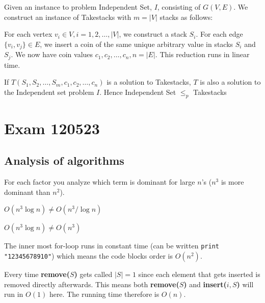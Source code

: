 \documentclass[a4paper]{article}
\newenvironment{task}[1]
{
	\begin{description}[align=right]
		\item [#1]
}{		%
	\end{description}
}
\newcommand{\abs}[1]{\left|#1\right|}
\DeclareMathOperator{\*}{\cdot}
\begin{document}
\begin{task}{(d)}
	\qquad Given an instance to problem Independent Set, $I$, consisting of $G(V,E)$. We construct an instance of Takestacks with $m=\abs{V}$ stacks as follows: 
	
	For each vertex $v_i\in V,i=1,2,\ldots,\abs{V}$, we construct a stack $S_i$. For each edge $\{v_i,v_j\}\in E$, we insert a coin of the same unique arbitrary value in stacks $S_i$ and $S_j$. We now have coin values $c_1,c_2,\ldots,c_n,n=\abs{E}$. This reduction runs in linear time.
	
	If $T(S_1,S_2,\ldots,S_m,c_1,c_2,\ldots,c_n)$ is a solution to Takestacks, $T$ is also a solution to the Independent set problem $I$.
	Hence Independent Set $\leq_p$ Takestacks
\end{task}

\pagebreak
\section*{Exam 120523}
\subsection*{Analysis of algorithms}

\begin{task}{1. (a)}
	 For each factor you analyze which term is dominant for large $n$'s ($n^3$ is more dominant than $n^2$). 
\end{task}

\begin{task}{(b)}
	 $O(n^3\log n)\neq O(n^3/\log n)$
\end{task}

\begin{task}{(c)}
	 $O(n^3\log n)\neq O(n^3)$
\end{task}

\begin{task}{2. (a)}
	 The inner most for-loop runs in constant time (can be written \texttt{print "12345678910"}) which means the code blocks order is $O(n^2)$.
\end{task}

\begin{task}{3. (a)}
	 Every time \textbf{remove($S$)} gets called $\abs{S}=1$ since each element that gets inserted is removed directly afterwards. This means both \textbf{remove($S$)} and \textbf{insert($i,S$)} will run in $O(1)$ here. The running time therefore is $O(n)$.
\end{task}
\end{document}
